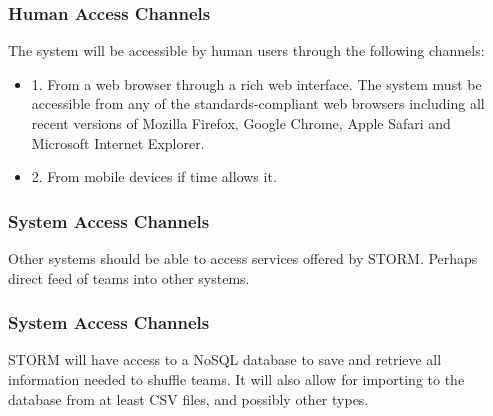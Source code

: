 \subsubsection{Human Access Channels}
The system will be accessible by human users through the following channels:\par
\begin{itemize}
\item 1. From a web browser through a rich web interface. The system must be accessible from any of
the standards-compliant web browsers including all recent versions of Mozilla Firefox, Google
Chrome, Apple Safari and Microsoft Internet Explorer.
\item 2. From mobile devices if time allows it.
\end{itemize}
\subsubsection{System Access Channels}
Other systems should be able to access services offered by STORM. Perhaps direct feed of teams into other systems.
\subsubsection{System Access Channels}
STORM will have access to a NoSQL database to save and retrieve all information needed to shuffle teams. It will also allow for importing to the database from at least CSV files, and possibly other types.